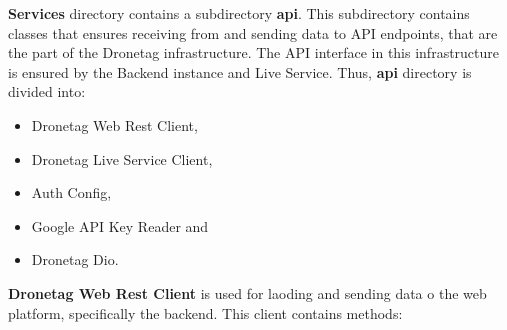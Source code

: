 \textbf{Services} directory contains a subdirectory \textbf{api}.
This subdirectory contains classes that ensures receiving from and sending data to API endpoints, that are the part of the Dronetag infrastructure.
The API interface in this infrastructure is ensured by the Backend instance and Live Service.
Thus, \textbf{api} directory is divided into:
\begin{itemize}
    \item Dronetag Web Rest Client,
    \item Dronetag Live Service Client,
    \item Auth Config,
    \item Google API Key Reader and
    \item Dronetag Dio.
\end{itemize}
\textbf{Dronetag Web Rest Client} is used for laoding and sending data o the web platform, specifically the backend.
This client contains methods:
